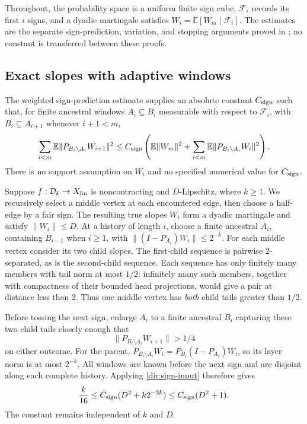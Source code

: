 Throughout, the probability space is a uniform finite sign cube,
$\mathcal F_i$ records its first $i$ signs, and a dyadic martingale
satisfies $W_i=\mathbb E[W_m\mid\mathcal F_i]$. The estimates are the
separate sign-prediction, variation, and stopping arguments proved in
\cite{TreePotentials}; no constant is transferred between these proofs.

\subsection{Exact slopes with adaptive windows}\label{dir:adaptive-windows}
The weighted sign-prediction estimate
\cite[Theorem~6.4]{TreePotentials} supplies an absolute constant
$C_{\rm sign}$ such that, for finite ancestral windows
$A_i\subseteq B_i$ measurable with respect to $\mathcal F_i$, with
$B_i\subseteq A_{i+1}$ whenever $i+1<m$,
\begin{equation}\label{dir:sign-input}
 \sum_{i<m}\mathbb E\|P_{B_i\setminus A_i}W_{i+1}\|^2
 \le C_{\rm sign}\left(\mathbb E\|W_m\|^2+
       \sum_{i<m}\mathbb E\|P_{B_i\setminus A_i}W_i\|^2\right).
\end{equation}
There is no support assumption on $W_i$ and no specified numerical
value for $C_{\rm sign}$.

Suppose $f:\mathcal D_k\to X_{\rm lin}$ is noncontracting and $D$-Lipschitz, where
$k\ge1$.  We recursively select a middle vertex at each encountered
edge, then choose a half-edge by a fair sign.  The resulting true slopes
$W_i$ form a dyadic martingale and satisfy $\|W_i\|\le D$.
At a history of length $i$, choose a finite ancestral $A_i$, containing
$B_{i-1}$ when $i\ge1$, with
$\|(I-P_{A_i})W_i\|\le2^{-k}$.  For each middle vertex consider its two
child slopes.  The first-child sequence is pairwise $2$-separated, as
is the second-child sequence.  Each sequence has only finitely many
members with tail norm at most $1/2$: infinitely many such members,
together with compactness of their bounded head projections, would
give a pair at distance less than $2$.  Thus one middle vertex has
\emph{both} child tails greater than $1/2$.

Before tossing the next sign, enlarge $A_i$ to a finite ancestral $B_i$
capturing these two child tails closely enough that
\[
 \|P_{B_i\setminus A_i}W_{i+1}\|>1/4
\]
on either outcome.  For the parent,
$P_{B_i\setminus A_i}W_i=P_{B_i}(I-P_{A_i})W_i$, so its layer norm is
at most $2^{-k}$.  All windows are known before the next sign and are
disjoint along each complete history.  Applying
\eqref{dir:sign-input} therefore gives
\begin{equation}\label{dir:adaptive-conclusion}
 \frac{k}{16}\le C_{\rm sign}(D^2+k2^{-2k})
 \le C_{\rm sign}(D^2+1).
\end{equation}
The constant remains independent of $k$ and $D$.

